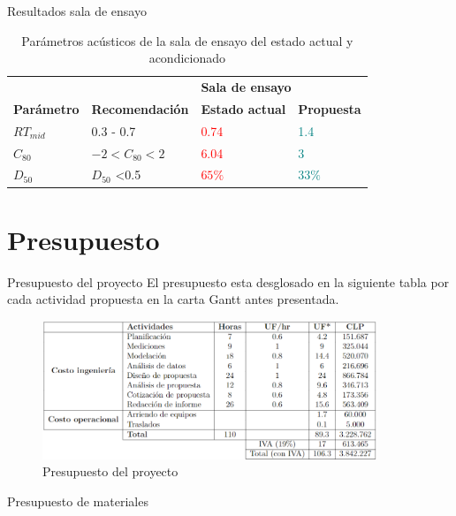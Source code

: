 \documentclass{sintefbeamer}
\begin{document}
\begin{frame}{Resultados sala de ensayo}
   
\begin{table}[H]
    \centering
    \caption{Parámetros acústicos de la sala de ensayo del estado actual y acondicionado}
    \label{tab: resultados sala de ensayo}
    \begin{tabular}{|l|l|ll|}
    \hline
     &  & \multicolumn{2}{l|}{\textbf{Sala de ensayo}} \\ \cline{3-4} 
    \multirow{-2}{*}{\textbf{Parámetro}} & \multirow{-2}{*}{\textbf{Recomendación}} & \multicolumn{1}{l|}{\textbf{Estado actual}} & \textbf{Propuesta} \\ \hline
    $RT_{mid}$ & 0.3 - 0.7 & \multicolumn{1}{l|}{\textcolor{red}{0.74}} & \textcolor{teal}{1.4} \\ \hline
    $C_{80}$ & $-2<C_{80}<2$ & \multicolumn{1}{l|}{\textcolor{red}{6.04}} & \textcolor{teal}{3} \\ \hline
    $D_{50}$ & $D_{50}$ \textless 0.5 & \multicolumn{1}{l|}{\textcolor{red}{$65\%$}} & \textcolor{teal}{$33\%$} \\ \hline
    \end{tabular}
\end{table}
\end{frame}


\section{Presupuesto}
\begin{frame}{Presupuesto del proyecto}
    El presupuesto esta desglosado en la siguiente tabla por cada actividad propuesta en la carta Gantt antes presentada.
\begin{figure}[H]
    \centering
    \includegraphics[width=10cm]{images/Presupuesto.png}
    \caption{Presupuesto del proyecto}
    \label{fig:presupuesto}
\end{figure}    
\end{frame}

\begin{frame}{Presupuesto de materiales}
\end{frame}
\end{document}
